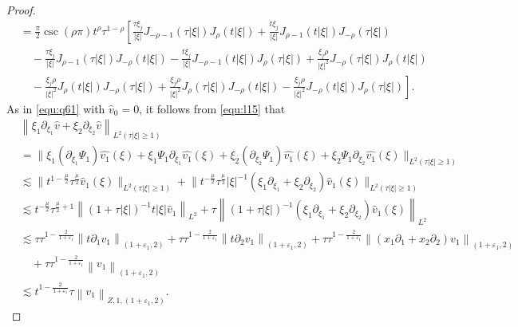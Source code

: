 \documentclass[11pt,twoside]{article}
\newcommand{\p}{\partial}
\theoremstyle{plain}
\theoremstyle{definition}
\theoremstyle{remark}
\numberwithin{equation}{section}
\begin{document}
\begin{proof}
\begin{equation}
\begin{aligned}
& =\frac{\pi}{2}\csc(\rho\pi)t^\rho \tau^{1-\rho}\left[\frac{\tau\xi_j}{|\xi|} J_{-\rho-1}(\tau|\xi|) J_\rho(t|\xi|)+\frac{t\xi_j}{|\xi|} J_{\rho-1}(t|\xi|) J_{-\rho}(\tau|\xi|)\right. \\
&\quad -\frac{\tau\xi_j}{|\xi|} J_{\rho-1}(\tau|\xi|) J_{-\rho}(t|\xi|)
-\frac{t\xi_j}{|\xi|} J_{-\rho-1}(t|\xi|) J_\rho(\tau|\xi|)+\frac{\xi_j\rho}{|\xi|^2} J_{-\rho}(\tau|\xi|) J_\rho(t|\xi|)\\
& \left.\quad -\frac{\xi_j\rho}{|\xi|^2} J_\rho(t|\xi|) J_{-\rho}(\tau|\xi|) +\frac{\xi_j\rho}{|\xi|^2} J_\rho(\tau|\xi|) J_{-\rho}(t|\xi|)-\frac{\xi_j\rho}{|\xi|^2} J_{-\rho}(t|\xi|) J_\rho(\tau|\xi|)\right].
\end{aligned}
\end{equation}
As in \eqref{equ:q61} with $\hat{v}_0=0$, it follows from \eqref{equ:l15} that
\begin{equation}\label{equ:l19}
\begin{aligned}
&\left\|\xi_1\p_{\xi_1}\hat{v}+\xi_2\p_{\xi_2}\hat{v}\right\|_{L^2(\tau|\xi|\geq1)}\\
&=\|\xi_1(\p_{\xi_1}\Psi_1)\hat{v_1}(\xi)+\xi_1\Psi_1\p_{\xi_1}\hat{v_1}(\xi)
+\xi_2(\p_{\xi_2}\Psi_1)\hat{v_1}(\xi)+\xi_2\Psi_1\p_{\xi_2}\hat{v_1}(\xi)\|_{L^2(\tau|\xi|\geq1)}\\
& \lesssim\big\|t^{1-\frac{\mu}{2}} \tau^{\frac{\mu}{2}} \hat{v}_1(\xi)\big\|_{L^2(\tau|\xi| \geqslant 1)}
+\big\|t^{-\frac{\mu}{2}} \tau^{\frac{\mu}{2}}|\xi|^{-1}\left(\xi_1 \partial_{ \xi_1}+\xi_2\partial_ {\xi_2}\right) \hat{v}_1\left(\xi\right)\big\|_{L^2(\tau|\xi| \geqslant 1)}\\
& \lesssim t^{-\frac{\mu}{2}} \tau^{\frac{\mu}{2}+1} \left\|(1+\tau|\xi|)^{-1} t|\xi| \hat{v}_1\right\|_{L^2}+\tau\left\|(1+\tau|\xi|)^{-1}\left(\xi_1 \partial_{ \xi_1}+\xi_2 \partial_ {\xi_2}\right) \hat{v}_1\left(\xi\right)\right\|_{L^2}\\
&\lesssim  \tau \tau^{1-\frac{2}{1+\varepsilon_1}} \left\|t\p_1v_1\right\|_{\left(1+\varepsilon_1, 2\right)}+\tau \tau^{1-\frac{2}{1+\varepsilon_1}} \left\|t\p_2v_1\right\|_{\left(1+\varepsilon_1, 2\right)}+\tau \tau^{1-\frac{2}{1+\varepsilon_1}} \left\|(x_1\p_1+x_2\p_2)v_1\right\|_{\left(1+\varepsilon_1, 2\right)}\\
&\quad+\tau \tau^{1-\frac{2}{1+\varepsilon_1}} \left\|v_1\right\|_{\left(1+\varepsilon_1, 2\right)}\\
&\lesssim t^{1-\frac{2}{1+\varepsilon_1}} \tau\left\|v_1\right\|_{Z, 1, \left(1+\varepsilon_1, 2\right)}.
\end{aligned}

\end{equation}
\end{proof}
\end{document}
